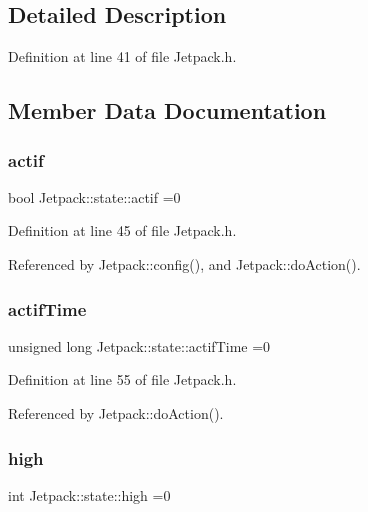 \subsection{Detailed Description}


Definition at line 41 of file Jetpack.\+h.



\subsection{Member Data Documentation}
\mbox{\label{structJetpack_1_1state_aa177541689bbaea21a4650a083b0df77}} 
\subsubsection{\texorpdfstring{actif}{actif}}
{\footnotesize\ttfamily bool Jetpack\+::state\+::actif =0}



Definition at line 45 of file Jetpack.\+h.



Referenced by Jetpack\+::config(), and Jetpack\+::do\+Action().

\mbox{\label{structJetpack_1_1state_af2e1cc323ef9ffcc3cf4d203f85d726b}} 
\subsubsection{\texorpdfstring{actif\+Time}{actifTime}}
{\footnotesize\ttfamily unsigned long Jetpack\+::state\+::actif\+Time =0}



Definition at line 55 of file Jetpack.\+h.



Referenced by Jetpack\+::do\+Action().

\mbox{\label{structJetpack_1_1state_a54cc9291c7cc30102a07fd2b0ccd8dde}} 
\subsubsection{\texorpdfstring{high}{high}}
{\footnotesize\ttfamily int Jetpack\+::state\+::high =0}



